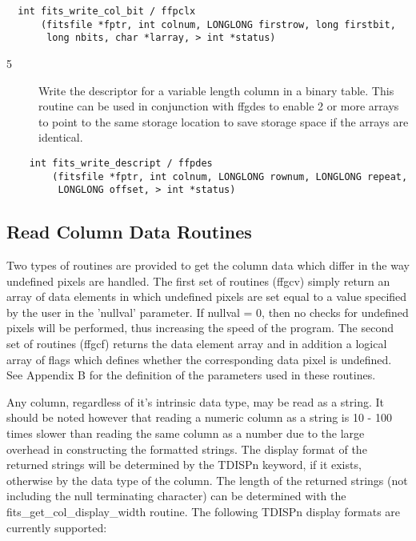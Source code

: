 \documentclass[11pt]{book}
\begin{document}
\begin{verbatim}
  int fits_write_col_bit / ffpclx
      (fitsfile *fptr, int colnum, LONGLONG firstrow, long firstbit,
       long nbits, char *larray, > int *status)
\end{verbatim}

\begin{description}
\item[5 ] Write the descriptor for a variable length column in a binary table.
    This routine can be used in conjunction with ffgdes to enable
    2 or more arrays to point to the same storage location to save
   storage space if the arrays are identical. \label{ffpdes}
\end{description}

\begin{verbatim}
    int fits_write_descript / ffpdes
        (fitsfile *fptr, int colnum, LONGLONG rownum, LONGLONG repeat,
         LONGLONG offset, > int *status)
\end{verbatim}

\subsection{Read Column Data Routines}

Two types of routines are provided to get the column data which differ
in the way undefined pixels are handled.  The first set of routines
(ffgcv) simply return an array of data elements in which undefined
pixels are set equal to a value specified by the user in the 'nullval'
parameter.  If nullval = 0, then no checks for undefined pixels will be
performed, thus increasing the speed of the program.  The second set of
routines (ffgcf) returns the data element array and in addition a
logical array of flags which defines whether the corresponding data
pixel is undefined.  See Appendix B for the definition of the
parameters used in these routines.

    Any column, regardless of it's intrinsic data type, may be read as a
    string.  It should be noted however that reading a numeric column as
    a string is 10 - 100 times slower than reading the same column as a number
    due to the large overhead in constructing the formatted strings.
    The display format of the returned strings will be
    determined by the TDISPn keyword, if it exists, otherwise by the
    data type of the column.  The length of the returned strings (not
    including the null terminating character) can be determined with
    the fits\_get\_col\_display\_width routine.  The following TDISPn
    display formats are currently supported:
\end{document}
